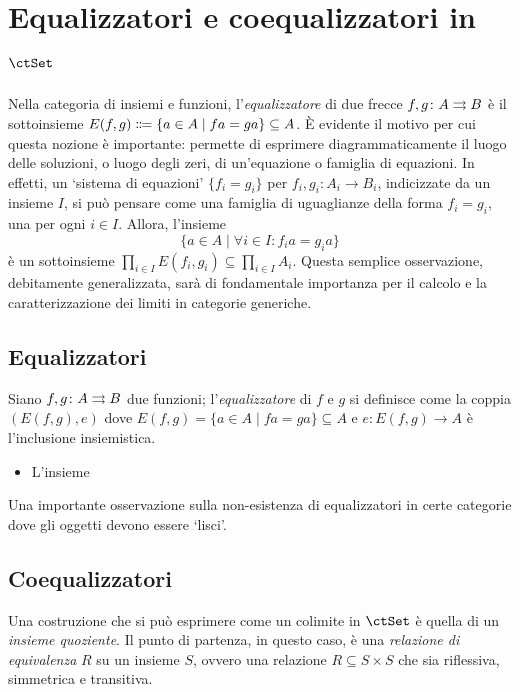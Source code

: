 \section{Equalizzatori e coequalizzatori in \(\ctSet\)}
Nella categoria di insiemi e funzioni, l'\emph{equalizzatore} di due frecce \(f,g \colon A \rightrightarrows B\) è il sottoinsieme \(E(f,g) \defeq \{a\in A\mid fa=ga\} \subseteq A\). È evidente il motivo per cui questa nozione è importante: permette di esprimere diagrammaticamente il luogo delle soluzioni, o luogo degli zeri, di un'equazione o famiglia di equazioni. In effetti, un `sistema di equazioni' \(\{f_i=g_i\}\) per \(f_i,g_i \colon A_i \to B_i\), indicizzate da un insieme \(I\), si può pensare come una famiglia di uguaglianze della forma \(f_i = g_i\), una per ogni \(i\in I\). Allora, l'insieme
\[\{a\in A\mid \forall i\in I\colon f_ia=g_ia\}\]
è un sottoinsieme \(\prod_{i\in I} E(f_i,g_i) \subseteq \prod_{i\in I} A_i\). Questa semplice osservazione, debitamente generalizzata, sarà di fondamentale importanza per il calcolo e la caratterizzazione dei limiti in categorie generiche.
\subsection{Equalizzatori}
\begin{definition}
 Siano \(f,g\colon A\rightrightarrows B\) due funzioni; l'\emph{equalizzatore} di \(f\) e \(g\) si definisce come la coppia \((E(f,g),e)\) dove \(E(f,g)=\{a\in A\mid fa=ga\}\subseteq A\) e \(e\colon E(f,g)\to A\) è l'inclusione insiemistica.
\end{definition}
\begin{remark}
 \begin{itemize}
  \item L'insieme
 \end{itemize}
\end{remark}
\begin{example}
\end{example}
\begin{remark}
 Una importante osservazione sulla non-esistenza di equalizzatori in certe categorie dove gli oggetti devono essere `lisci'.
\end{remark}
\subsection{Coequalizzatori}\label{subsec_coeqs_set}
Una costruzione che si può esprimere come un colimite in \(\ctSet\) è quella di un \emph{insieme quoziente}. Il punto di partenza, in questo caso, è una \emph{relazione di equivalenza} \(R\) su un insieme \(S\), ovvero una relazione \(R\subseteq S\times S\) che sia riflessiva, simmetrica e transitiva.

